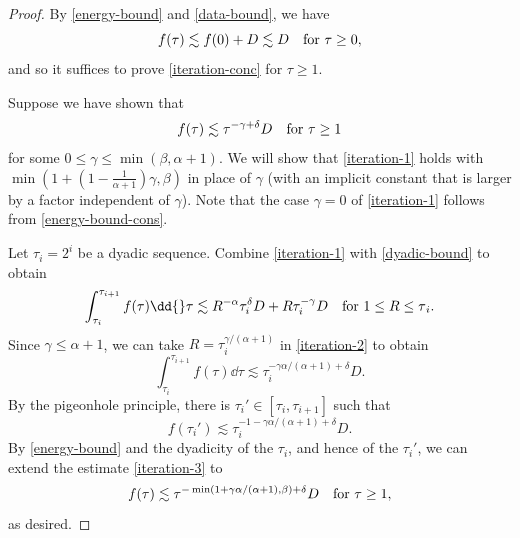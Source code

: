 \documentclass[10pt, reqno]{amsart}
\begin{document}
\begin{proof}
By \cref{energy-bound} and \cref{data-bound}, we have
\begin{equation}\label{energy-bound-cons}
f(\tau{})\lesssim f(0) + D\lesssim D\quad \textnormal{for }\tau{}\ge 0,
\end{equation}
and so it suffices to prove \cref{iteration-conc} for \(\tau{}\ge 1\).

 Suppose we
have shown that
\begin{equation}\label{iteration-1}
f(\tau{})\lesssim \tau^{-\gamma{}+\delta{}}D\quad \textnormal{for }\tau{}\ge 1
\end{equation}
for some \(0\le \gamma{}\le \min (\beta{},\alpha{}+1)\). We will show that \cref{iteration-1} holds with
\(\min (1 + (1-\frac{1}{\alpha{}+1})\gamma{},\beta{})\) in place of \(\gamma{}\)
(with an implicit constant that is larger by a factor independent of
\(\gamma{}\)). Note that the case \(\gamma{} = 0\) of \cref{iteration-1} follows
from \cref{energy-bound-cons}.

Let \(\tau_i=2^i\) be a dyadic sequence. Combine \cref{iteration-1} with
\cref{dyadic-bound} to obtain
\begin{equation}\label{iteration-2}
\int_{\tau_i}^{\tau_{i + 1}} f(\tau{})\dd{}\tau{}\lesssim R^{-\alpha{}}\tau_i^\delta{}D + R\tau_i^{-\gamma{}}D\quad \textnormal{for }1\le R\le \tau{}_i.
\end{equation}
Since \(\gamma{}\le \alpha{} + 1\), we can take \(R = \tau_i^{\gamma{}/(\alpha{}+1)}\) in \cref{iteration-2} to obtain
\begin{equation}
\int_{\tau_i}^{\tau_{i + 1}} f(\tau{})\dd{}\tau{}\lesssim \tau{}_i^{-\gamma{}\alpha{}/(\alpha{}+1)+\delta{}}D.
\end{equation}
By the pigeonhole principle, there is \(\tau_i'\in [\tau_i,\tau_{i + 1}]\) such that
\begin{equation}\label{iteration-3}
f(\tau{}_i')\lesssim \tau{}_i^{-1-\gamma{}\alpha{}/(\alpha{}+1)+\delta{}}D.
\end{equation}
By \cref{energy-bound} and the dyadicity of the \(\tau_i\), and hence of the \(\tau_i'\),
we can extend the estimate \cref{iteration-3} to
\begin{equation}\label{iteration-4}
f(\tau{})\lesssim \tau{}^{-\min (1+\gamma{}\alpha{}/(\alpha{}+1),\beta{})+\delta{}}D\quad \textnormal{for }\tau{}\ge 1,
\end{equation}
as desired.


\end{proof}
\end{document}
